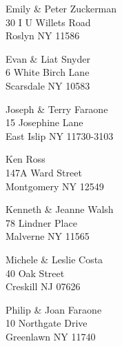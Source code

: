\documentclass{article}
\begin{document}
\begin{center}
\begin{Huge}
\clearpage

\vspace*{\fill}
Emily \& Peter Zuckerman\\
30 I U Willets Road\\
Roslyn NY 11586\\
\vspace{\fill}

\clearpage

\vspace*{\fill}
Evan \& Liat Snyder\\
6 White Birch Lane\\
Scarsdale NY 10583\\
\vspace{\fill}

\clearpage

\vspace*{\fill}
Joseph \& Terry Faraone\\
15 Josephine Lane\\
East Islip NY 11730-3103\\
\vspace{\fill}

\clearpage

\vspace*{\fill}
Ken Ross\\
147A Ward Street\\
Montgomery NY 12549\\
\vspace{\fill}

\clearpage

\vspace*{\fill}
Kenneth \& Jeanne Walsh\\
78 Lindner Place\\
Malverne NY 11565\\
\vspace{\fill}

\clearpage

\vspace*{\fill}
Michele \& Leslie Costa\\
40 Oak Street\\
Creskill NJ 07626\\
\vspace{\fill}

\clearpage

\vspace*{\fill}
Philip \& Joan Faraone\\
10 Northgate Drive\\
Greenlawn NY 11740\\
\vspace{\fill}


\end{Huge}
\end{center}
\end{document}
